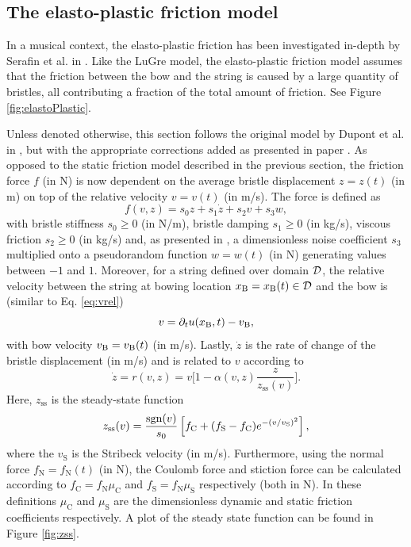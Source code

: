 \subsection{The elasto-plastic friction model}\label{sec:elastoPlastic}
In a musical context, the elasto-plastic friction has been investigated in-depth by Serafin et al. in \cite{Serafin2003, Serafin2004, Avanzini2005}. Like the LuGre model, the elasto-plastic friction model assumes that the friction between the bow and the string is caused by a large quantity of bristles, all contributing a fraction of the total amount of friction. See Figure \ref{fig:elastoPlastic}.



Unless denoted otherwise, this section follows the original model by Dupont et al. in \cite{Dupont2002}, but with the appropriate corrections added as presented in paper \citeP[C]. As opposed to the static friction model described in the previous section, the friction force $f$ (in N) is now dependent on the average bristle displacement $z = z(t)$ (in m) on top of the relative velocity $v = v(t)$ (in m/s). The force is defined as
\begin{equation}\label{eq:elastoPlasticForce}
    f(v, z) = s_0z + s_1\dot z + s_2v + s_3w,
\end{equation}
with bristle stiffness $s_0 \geq 0$ (in N/m), bristle damping $s_1 \geq 0$ (in kg/s), viscous friction $s_2 \geq 0$ (in kg/s) and, as presented in \cite{Serafin2004}, a dimensionless noise coefficient $s_3$ multiplied onto a pseudorandom function $w = w(t)$ (in N) generating values between $-1$ and $1$. Moreover, for a string defined over domain $\mathcal{D}$, the relative velocity between the string at bowing location $x_{\text{B}} = x_{\text{B}}(t) \in \mathcal{D}$ and the bow is (similar to Eq. \eqref{eq:vrel})
\begin{equation}\label{eq:vrelElasto}
    v = \partial_t u(x_{\text{B}},t) - v_{\text{B}},
\end{equation}
with bow velocity $v_{\text{B}} = v_{\text{B}}(t)$ (in m/s). Lastly, $\dot z$ is the rate of change of the bristle displacement (in m/s) and is related to $v$ according to
\begin{equation}\label{eq:zdot}
    \dot z = r(v, z) = v \bigg[ 1-  \alpha(v, z)\frac{z}{z_\text{ss}(v)}\bigg].
\end{equation}
Here, $z_\text{ss}$ is the steady-state function
\begin{equation}\label{eq:zss}
    z_\text{ss}(v) = \frac{\text{sgn}(v)}{s_0}\left[f_\text{C}+(f_\text{S}-f_\text{C})e^{-(v/v_\text{S})^2}\right],
\end{equation}
where the $v_\text{S}$ is the Stribeck velocity (in m/s). Furthermore, using the normal force $f_\text{N} = f_\text{N}(t)$ (in N), the Coulomb force and stiction force can be calculated according to $f_\text{C} = f_\text{N}\mu_\text{C}$ and $f_\text{S} = f_\text{N}\mu_\text{S}$ respectively (both in N). In these definitions $\mu_\text{C}$ and $\mu_\text{S}$ are the dimensionless dynamic and static friction coefficients respectively. A plot of the steady state function can be found in Figure \ref{fig:zss}.


